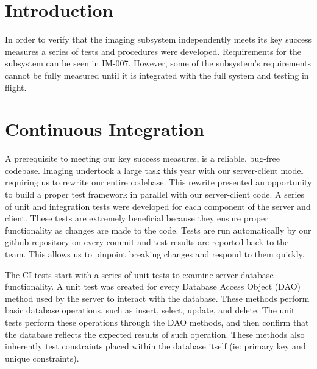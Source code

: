 \documentclass[]{auvsi_doc}
\begin{document}
\begin{AUVSITitlePage}
\begin{artifacttable}
\end{artifacttable}
\end{AUVSITitlePage}

\section{Introduction}

In order to verify that the imaging subsystem independently meets its key success
measures a series of tests and procedures were developed. Requirements for the subsystem
can be seen in IM-007. However, some of the subsystem's requirements cannot be fully
measured until it is integrated with the full system and testing in flight.

\section{Continuous Integration}

A prerequisite to meeting our key success measures, is a reliable, bug-free codebase.
Imaging undertook a large task this year with our server-client model requiring us
to rewrite our entire codebase. This rewrite presented an opportunity to build a 
proper test framework in parallel with our server-client code. A series of unit and
integration tests were developed for each component of the server and client. These 
tests are extremely beneficial because they ensure proper functionality as changes
are made to the code. Tests are run automatically by our github repository on every
commit and test results are reported back to the team. This allows us to pinpoint 
breaking changes and respond to them quickly.

The CI tests start with a series of unit tests to examine server-database functionality.
A unit test was created for every Database Access Object (DAO) method used by the
server to interact with the database. These methods perform basic database operations,
such as insert, select, update, and delete. The unit tests perform these operations
through the DAO methods, and then confirm that the database reflects the expected
results of such operation. These methods also inherently test constraints placed
within the database itself (ie: primary key and unique constraints).
\end{document}
